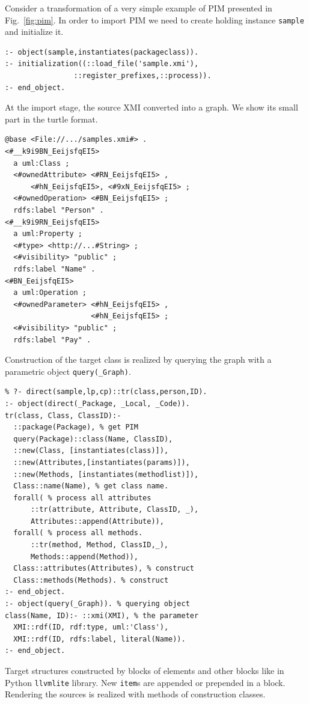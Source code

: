 \documentclass[runningheads]{llncs}
\begin{document}
Consider a transformation of a very simple example of PIM presented in Fig.~\ref{fig:pim}.  In order to import PIM we need to create holding instance \texttt{sample} and initialize it.
\begin{verbatim}
:- object(sample,instantiates(packageclass)).
:- initialization((::load_file('sample.xmi'),
                ::register_prefixes,::process)).
:- end_object.
\end{verbatim}
At the import stage, the source XMI converted into a graph.  We show its small part in the turtle format.
\begin{verbatim}
@base <File://.../samples.xmi#> .
<#__k9i9BN_EeijsfqEI5>
  a uml:Class ;
  <#ownedAttribute> <#RN_EeijsfqEI5> ,
      <#hN_EeijsfqEI5>, <#9xN_EeijsfqEI5> ;
  <#ownedOperation> <#BN_EeijsfqEI5> ;
  rdfs:label "Person" .
<#__k9i9RN_EeijsfqEI5>
  a uml:Property ;
  <#type> <http://...#String> ;
  <#visibility> "public" ;
  rdfs:label "Name" .
<#BN_EeijsfqEI5>
  a uml:Operation ;
  <#ownedParameter> <#hN_EeijsfqEI5> ,
                    <#hN_EeijsfqEI5> ;
  <#visibility> "public" ;
  rdfs:label "Pay" .
\end{verbatim}

Construction of the target class is realized by querying the graph with a parametric object \texttt{query(\_Graph)}.
\begin{verbatim}
% ?- direct(sample,lp,cp)::tr(class,person,ID).
:- object(direct(_Package, _Local, _Code)).
tr(class, Class, ClassID):-
  ::package(Package), % get PIM
  query(Package)::class(Name, ClassID),
  ::new(Class, [instantiates(class)]),
  ::new(Attributes,[instantiates(params)]),
  ::new(Methods, [instantiates(methodlist)]),
  Class::name(Name), % get class name.
  forall( % process all attributes
      ::tr(attribute, Attribute, ClassID, _),
      Attributes::append(Attribute)),
  forall( % process all methods.
      ::tr(method, Method, ClassID,_),
      Methods::append(Method)),
  Class::attributes(Attributes), % construct
  Class::methods(Methods). % construct
:- end_object.
:- object(query(_Graph)). % querying object
class(Name, ID):- ::xmi(XMI), % the parameter
  XMI::rdf(ID, rdf:type, uml:'Class'),
  XMI::rdf(ID, rdfs:label, literal(Name)).
:- end_object.
\end{verbatim}

Target structures constructed by blocks of elements and other blocks like in Python \texttt{llvmlite} library.  New \texttt{item}s are appended or prepended in a block.  Rendering the sources is realized with methods of construction classes.
\end{document}
